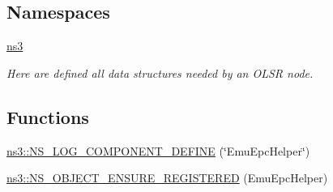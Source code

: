 \subsection*{Namespaces}
\begin{DoxyCompactItemize}
\item 
 \hyperlink{namespacens3}{ns3}
\begin{DoxyCompactList}\small\item\em Here are defined all data structures needed by an O\+L\+SR node. \end{DoxyCompactList}\end{DoxyCompactItemize}
\subsection*{Functions}
\begin{DoxyCompactItemize}
\item 
\hyperlink{namespacens3_a53a38af88d7c2175a0507347e925efd7}{ns3\+::\+N\+S\+\_\+\+L\+O\+G\+\_\+\+C\+O\+M\+P\+O\+N\+E\+N\+T\+\_\+\+D\+E\+F\+I\+NE} (\char`\"{}Emu\+Epc\+Helper\char`\"{})
\item 
\hyperlink{namespacens3_ae604741189702e0a6af7d13baa4cf041}{ns3\+::\+N\+S\+\_\+\+O\+B\+J\+E\+C\+T\+\_\+\+E\+N\+S\+U\+R\+E\+\_\+\+R\+E\+G\+I\+S\+T\+E\+R\+ED} (Emu\+Epc\+Helper)
\end{DoxyCompactItemize}
